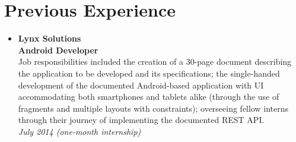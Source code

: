 \documentclass[12pt,a4paper]{article}
\begin{document}
\section*{Previous Experience}
	\begin{itemize}
	\item	{\large\textbf{Lynx Solutions}}\\
			\textbf{Android Developer}\\
			Job responsibilities included the creation of a 30-page document describing the application to be developed and its specifications; the single-handed development of the documented Android-based application with UI accommodating both smartphones and tablets alike (through the use of fragments and multiple layouts with constraints); overseeing fellow interns through their journey of implementing the documented REST API.\\
			\textit{July 2014 (one-month internship)}
	\end{itemize}

\newpage
\end{document}
